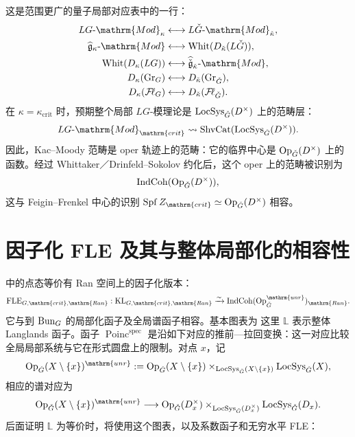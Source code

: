 这是范围更广的量子局部对应表中的一行：
\[\begin{aligned}
LG\text{-}\mathrm{Mod}_{\kappa}&\longleftrightarrow L\checkG\text{-}\mathrm{Mod}_{\check\kappa},\\
\widehat{\mathfrak g}_{\kappa}\text{-}\mathrm{Mod}&\longleftrightarrow\Whit(D_{\check\kappa}(L\checkG)),\\
\Whit(D_{\kappa}(LG))&\longleftrightarrow\widehat{\check{\mathfrak g}}_{\check\kappa}\text{-}\mathrm{Mod},\\
D_{\kappa}(\Gr_G)&\longleftrightarrow D_{\check\kappa}(\Gr_{\checkG}),\\
D_{\kappa}(\Fl_G)&\longleftrightarrow D_{\check\kappa}(\Fl_{\checkG}).
\end{aligned}\]
在 $\kappa=\kappa_{\mathrm{crit}}$ 时，预期整个局部 $LG$-模理论是 $\operatorname{LocSys}_{\check{G}}(D^\times)$ 上的范畴层：
\[LG\text{-}\mathrm{Mod}_{\mathrm{crit}}\rightsquigarrow\operatorname{ShvCat}(\LocSys_{\checkG}(D^\times)).\]
因此，Kac–Moody 范畴是 oper 轨迹上的范畴：它的临界中心是 $\operatorname{Op}_{\check{G}}(D^\times)$ 上的函数。经过 Whittaker／Drinfeld–Sokolov 约化后，这个 oper 上的范畴被识别为
\[\operatorname{IndCoh}(\operatorname{Op}_{\check{G}}(D^\times)),\]
这与 Feigin–Frenkel 中心的识别 $\operatorname{Spf}Z_{\mathrm{crit}}\simeq\Op_{\checkG}(D^\times)$ 相容。

\section{因子化 FLE 及其与整体局部化的相容性}\label{sec:15.5}
中的点态等价有 Ran 空间上的因子化版本\cite{ABC24a}：
\[\operatorname{FLE}_{G,\mathrm{crit},\mathrm{Ran}}:\operatorname{KL}_{G,\mathrm{crit},\mathrm{Ran}}\xrightarrow{\sim}\IndCoh(\Op^{\mathrm{unr}}_{\checkG})_{\mathrm{Ran}}.\]
它与到 $\operatorname{Bun}_G$ 的局部化函子及全局谱函子相容。基本图表为
这里 $\mathbb L$ 表示整体 Langlands 函子。函子 $\operatorname{Poinc}^{\mathrm{spec}}$ 是沿如下对应的推前—拉回变换：这一对应比较全局局部系统与它在形式圆盘上的限制。对点 $x$，记
\[\Op_{\checkG}(X\setminus\{x\})^{\mathrm{unr}}:=\Op_{\checkG}(X\setminus\{x\})\times_{\LocSys_{\checkG}(X\setminus\{x\})}\LocSys_{\checkG}(X),\]
相应的谱对应为
\[\Op_{\checkG}(X\setminus\{x\})^{\mathrm{unr}}\longrightarrow\Op_{\checkG}(D_x^\times)\times_{\LocSys_{\checkG}(D_x^\times)}\LocSys_{\checkG}(D_x).\]
后面证明 $\mathbb L$ 为等价时，将使用这个图表，以及系数函子和无穷水平 FLE：

